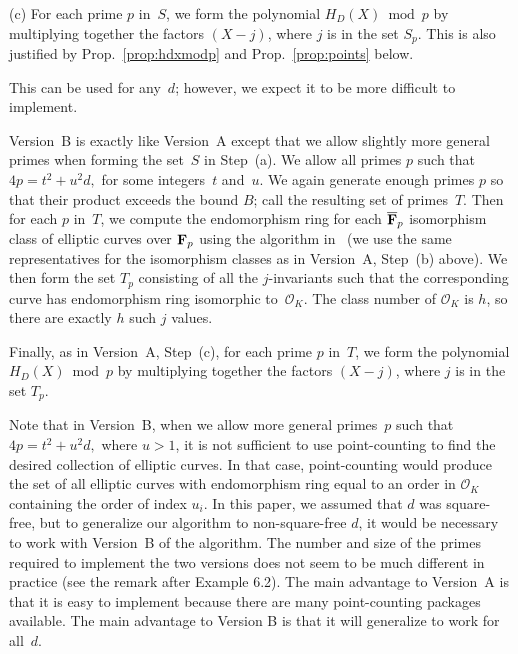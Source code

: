 \documentclass{amsart}
\newcommand{\F}{{\bf{F}}}
\newcommand{\OO}{\mathcal{O}}
\newcommand{\noi}{\noindent}
\newcommand{\bigo}{{\rm O}}
\theoremstyle{plain}
\begin{document}
\noi (c) For each prime $p$ in~$S$, we form the polynomial $H_D(X) \bmod{p}$
by multiplying together the factors $(X-j)$, where $j$ is in the set $S_p$. 
This is also justified by Prop.~\ref{prop:hdxmodp} and
Prop.~\ref{prop:points} below.


\vspace{0.1in}

\noi {\bf Version~B:} This can be used for any~$d$; however, we expect
it to be more difficult to implement.

\vspace{0.1in}

\noi Version~B is exactly like Version~A except that we allow slightly
more general primes when forming the set~$S$ in Step~(a).
We allow all primes $p$ such that
$4p = t^2 + u^2 d,$ for some integers~$t$ and~$u$. 
We again generate enough primes $p$
so that their product exceeds the bound $B$;
call the resulting set of primes~$T$.
Then for each $p$ in~$T$, we compute the endomorphism ring for each 
$\overline{\F}_p$ isomorphism class of elliptic curves over $\F_p$
using the algorithm in~\cite{kohel} (we use the same representatives
for the isomorphism classes as in Version~A, Step~(b) above).
We then form the set $T_p$ consisting of all the 
$j$-invariants such that the corresponding curve has endomorphism ring
isomorphic to~$\OO_K$.
The class number of $\OO_K$ is $h$, so there are exactly $h$ such $j$ values.


Finally, as in Version~A, Step~(c), for each prime $p$ in~$T$, 
we form the polynomial $H_D(X) \bmod{p}$
by multiplying together the factors $(X-j)$, where $j$ is in the set $T_p$. 

\vspace{0.1in}
\noi {\bf Remark 3.1.}
Note that in Version~B, when we allow more general primes~$p$ 
such that $4p = t^2+u^2d,$ where $u > 1$, it is not sufficient to use 
point-counting to find the desired collection of elliptic curves. 
In that case, point-counting would produce the set of all elliptic curves with 
endomorphism ring equal to an order in $\OO_K$ containing the order of index $u_i$.
In this paper, we assumed that $d$ was square-free, but
to generalize our algorithm to non-square-free $d$, it would be 
necessary to work with Version~B of the algorithm.  The number and size 
of the primes required to implement the two versions does not seem to be much 
different in practice (see the remark after Example 6.2).  The main advantage 
to Version~A is that it is easy to implement because there are many 
point-counting packages available.  
The main advantage to Version B is that it will generalize to work for all~$d$.
\end{document}
